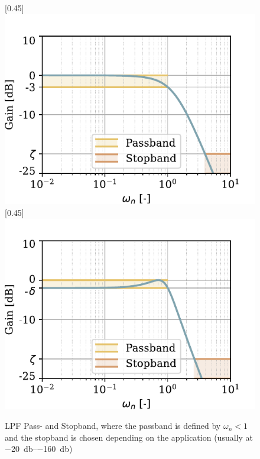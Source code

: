 \begin{figure}[!htb]
  \centering
  [0.45\textwidth]{%
    \includegraphics[scale=0.72]{figures/electronics/lowpass/lp_filter_2ord_bessel_bp}}
  \hfill
  [0.45\textwidth]{%
    \includegraphics[scale=0.72]{figures/electronics/lowpass/lp_filter_2ord_cheby_bp}}
  \caption[\ac{LPF} Pass- and Stopband]{\ac{LPF} Pass- and Stopband, where the passband is defined by $\omega_n<1$ and the stopband is chosen depending on the application (usually at \SIrange{-20}{-160}{\decibel})%
    \label{fig:lp_lowpass_pass_stopband}}
\end{figure}

